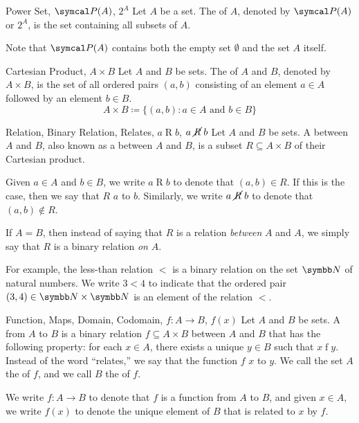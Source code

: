 \documentclass[12pt]{report}
\begin{document}
\begin{dfnbox}{Power Set, $\powerset(A)$, $2^A$}
	Let $A$ be a set. The  of $A$, denoted by $\powerset(A)$ or $2^A$, is the set containing all subsets of $A$.
\end{dfnbox}

Note that $\powerset(A)$ contains both the empty set $\emptyset$ and the set $A$ itself.

\begin{dfnbox}{Cartesian Product, $A \times B$}
	Let $A$ and $B$ be sets. The  of $A$ and $B$, denoted by $A \times B$, is the set of all ordered pairs $(a, b)$ consisting of an element $a \in A$ followed by an element $b \in B$.
	\[ A \times B \coloneq \{ (a, b) : a \in A \text{ and } b \in B \} \]
\end{dfnbox}

\begin{dfnbox}{Relation, Binary Relation, Relates, $a \mathrel{R} b$, $a \mathrel{\cancel{R}} b$}
	Let $A$ and $B$ be sets. A  between $A$ and $B$, also known as a  between $A$ and $B$, is a subset $R \subseteq A \times B$ of their Cartesian product.

	Given $a \in A$ and $b \in B$, we write $a \mathrel{R} b$ to denote that  $(a, b) \in R$. If this is the case, then we say that $R$  $a$ to $b$. Similarly, we write $a \mathrel{\cancel{R}} b$ to denote that $(a, b) \notin R$.

	If $A = B$, then instead of saying that $R$ is a relation \textit{between} $A$ and $A$, we simply say that $R$ is a binary relation \textit{on} $A$.
\end{dfnbox}

For example, the less-than relation $<$ is a binary relation on the set $\N$ of natural numbers. We write $3 < 4$ to indicate that the ordered pair $(3, 4) \in \N \times \N$ is an element of the relation $<$.

\begin{dfnbox}{Function, Maps, Domain, Codomain, $f: A \to B$, $f(x)$}
	Let $A$ and $B$ be sets. A  from $A$ to $B$ is a binary relation $f \subseteq A \times B$ between $A$ and $B$ that has the following property: for each $x \in A$, there exists a unique $y \in B$ such that $x \mathrel{f} y$. Instead of the word ``relates,'' we say that the function $f$  $x$ to $y$. We call the set $A$ the  of $f$, and we call $B$ the  of $f$.

	We write $f: A \to B$ to denote that $f$ is a function from $A$ to $B$, and given $x \in A$, we write $f(x)$ to denote the unique element of $B$ that is related to $x$ by $f$.
\end{dfnbox}
\end{document}
